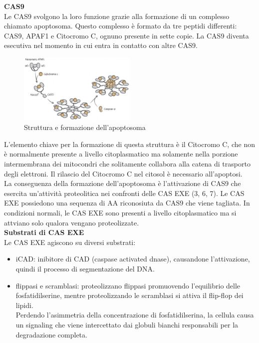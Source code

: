             \textbf{CAS9}\\
                Le CAS9 svolgono la loro funzione grazie alla formazione di un complesso chiamato apoptosoma. Questo complesso è formato da tre peptidi differenti: CAS9, APAF1 e Citocromo C, ognuno presente in sette copie. La CAS9 diventa esecutiva nel momento in cui entra in contatto con altre CAS9. \\
                \begin{figure}[h]
                    \centering
                    \includegraphics[width=0.5\textwidth]{images/apoptosoma.JPG}
                    \caption{\small Struttura e formazione dell'apoptosoma}            
                    \label{fig:mesh1}
                \end{figure} 
                L'elemento chiave per la formazione di questa struttura è il Citocromo C, che non è normalmente presente a livello citoplasmatico ma solamente nella porzione intermembrana dei mitocondri che solitamente collabora alla catena di trasporto degli elettroni. Il rilascio del Citocromo C nel citosol è necessario all'apoptosi.\\
                La conseguenza della formazione dell'apoptosoma è l'attivazione di CAS9 che esercita un'attività proteolitica nei confronti delle CAS EXE (3, 6, 7). Le CAS EXE possiedono una sequenza di AA riconosiuta da CAS9 che viene tagliata. In condizioni normali, le CAS EXE sono presenti a livello citoplasmatico ma si attviano solo qualora vengano proteolizzate.\\
                
            \textbf{Substrati di CAS EXE}\\
                Le CAS EXE agiscono su diversi substrati: 
                \begin{itemize}
                    \item iCAD: inibitore di CAD (caspase activated dnase), causandone l'attivazione, quindi il processo di segmentazione del DNA. 
                    \item flippasi e scramblasi: proteolizzano flippasi promuovendo l'equilibrio delle fosfatidilserine, mentre proteolizzando le scramblasi si attiva il flip-flop dei lipidi.\\
                    Perdendo l'asimmetria della concentrazione di fosfatidilserina, la cellula causa un signaling che viene intercettato dai globuli bianchi responsabili per la degradazione completa.
                \end{itemize}
                
